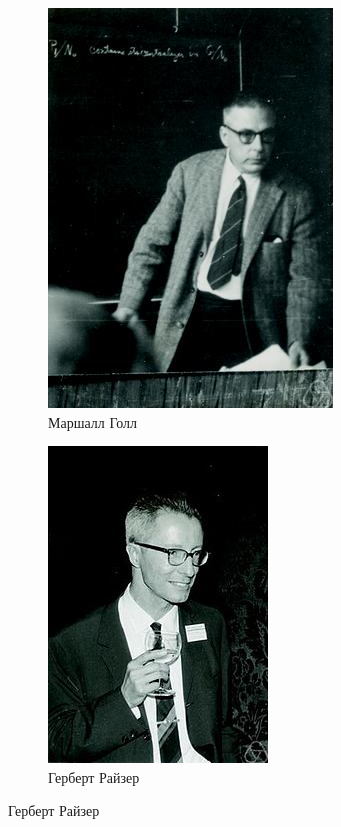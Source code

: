 \begin{figure}[ht]
    \begin{subfigure}[b]{0.5\textwidth}
        \centering
        \includegraphics[scale=0.3]{Images/Marshall_Hall.jpg}
        \caption*{Маршалл Голл}
    \end{subfigure}
    \begin{subfigure}[b]{0.5\textwidth}
        \centering
        \includegraphics[scale=0.4]{Images/Herbert_Ryser.jpg}
        \caption*{Герберт Райзер}
    \end{subfigure}
\end{figure}

